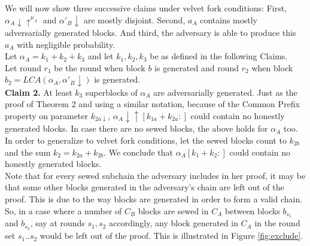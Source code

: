 \documentclass[11pt,a4paper]{article}
\begin{document}
We will now show three successive claims under velvet fork conditions: First, $\alpha_A \downarrow \uparrow^{\mu_A}$ and $\alpha'_B \downarrow$ are mostly disjoint. Second, $a_A$ contains mostly adversarially generated blocks. And third, the adversary is able to produce this $a_A$ with negligible probability.\\
Let $\alpha_A = k_1 + k_2 + k_3$ and let $k_1, k_2, k_3$ be as defined in the following Claims.\\
Let round $r_1$ be the round when block $b$ is generated and round $r_2$ when block $b_2 = LCA(\alpha_A, \alpha'_B\downarrow)$ is generated.\\

\textbf{Claim 2.} 
At least $k_3$ superblocks of $\alpha_A$ are adversarially generated. Just as the proof of Theorem 2 and using a similar notation, because of the Common Prefix property on parameter $k_{2a\downarrow}$, $\alpha_A \downarrow \uparrow [k_{1a}+k_{2a}:]$ could contain no honestly generated blocks. In case there are no sewed blocks, the above holds for $\alpha_A$ too. In order to generalize to velvet fork conditions, let the sewed blocks count to $k_{2b}$ and the sum $k_2 = k_{2a} + k_{2b}$. We conclude that $\alpha_A [k_{1}+k_{2}:]$ could contain no honestly generated blocks. \\ 
Note that for every sewed subchain the adversary includes in her proof, it may be that some other blocks generated in the adversary's chain are left out of the proof. This is due to the way blocks are generated in order to form a valid chain. So, in a case where a number of $C_B$ blocks are sewed in $C_A$ between blocks $b_{s_1}$ and $b_{s_2}$, say at rounds $s_1, s_2$ accordingly, any block generated in $C_A$ in the round set $s_1..s_2$ would be left out of the proof. This is illustrated in Figure \ref{fig:exclude}.\\
\end{document}
